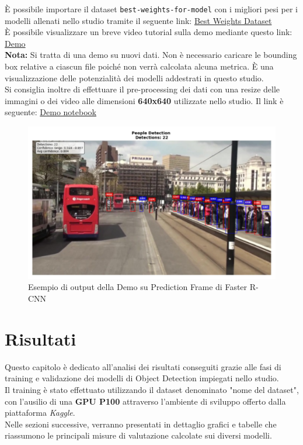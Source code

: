 \documentclass[12pt]{article}
\begin{document}
È possibile importare il dataset \texttt{best-weights-for-model} con i migliori pesi per i modelli allenati nello studio tramite il seguente link: \href{https://www.kaggle.com/datasets/denisecilia/best-weights-for-model}{Best Weights Dataset}\\
È possibile visualizzare un breve video tutorial sulla demo mediante questo link: \href{https://drive.google.com/file/d/1NDn_j8GwivCiABEhohK7GARY8-FcGkur/view?usp=drive_link}{Demo}\\
\textbf{Nota:} Si tratta di una demo su nuovi dati. Non è necessario caricare le bounding box relative a ciascun file poiché non verrà calcolata alcuna metrica. È una visualizzazione delle potenzialità dei modelli addestrati in questo studio. \\
Si consiglia inoltre di effettuare il pre-processing dei dati con una resize delle immagini o dei video alle dimensioni \textbf{640x640} utilizzate nello studio.
Il link è seguente: \href{https://www.kaggle.com/code/denisecilia/demo-for-machine-learning-project?scriptVersionId=249249609}{Demo notebook}

\begin{figure}[H]
    \centering
    \includegraphics[width=1.00\textwidth]{./img/output-demo-example.png}
    \caption{Esempio di output della Demo su Prediction Frame di Faster R-CNN}
    \label{fig:demo-output}
\end{figure}

\section{Risultati}
Questo capitolo è dedicato all'analisi dei risultati conseguiti grazie alle fasi di training e validazione dei modelli di Object Detection impiegati nello studio. \\
Il training è stato effettuato utilizzando il dataset denominato "nome del dataset", con l'ausilio di una \textbf{GPU P100} attraverso l'ambiente di sviluppo offerto dalla piattaforma \textit{Kaggle}.\\
Nelle sezioni successive, verranno presentati in dettaglio grafici e tabelle che riassumono le principali misure di valutazione calcolate sui diversi modelli.\\
\end{document}
